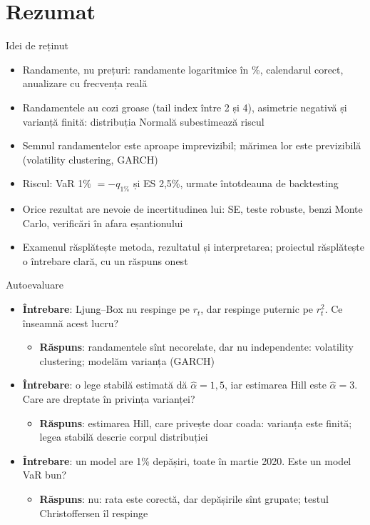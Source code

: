 \section{Rezumat}

\begin{frame}{Idei de reținut}
\itemsize{\small}
\begin{itemize}
    \item Randamente, nu prețuri: randamente logaritmice în \%, calendarul corect, anualizare cu frecvența reală
    \item Randamentele au cozi groase (tail index între 2 și 4), asimetrie negativă și varianță finită: distribuția Normală subestimează riscul
    \item Semnul randamentelor este aproape imprevizibil; mărimea lor este previzibilă (volatility clustering, GARCH)
    \item Riscul: VaR 1\% $= -q_{1\%}$ și ES 2,5\%, urmate întotdeauna de backtesting
    \item Orice rezultat are nevoie de incertitudinea lui: SE, teste robuste, benzi Monte Carlo, verificări în afara eșantionului
    \item Examenul răsplătește metoda, rezultatul și interpretarea; proiectul răsplătește o întrebare clară, cu un răspuns onest
\end{itemize}
\end{frame}

\begin{frame}{Autoevaluare}
\itemsize{\small}
\begin{itemize}
    \item \textbf{Întrebare}: Ljung--Box nu respinge pe $r_t$, dar respinge puternic pe $r_t^2$. Ce înseamnă acest lucru?
    \begin{itemize}
        \item \textbf{Răspuns}: randamentele sînt necorelate, dar nu independente: volatility clustering; modelăm varianța (GARCH)
    \end{itemize}
    \item \textbf{Întrebare}: o lege stabilă estimată dă $\hat\alpha = 1{,}5$, iar estimarea Hill este $\hat\alpha = 3$. Care are dreptate în privința varianței?
    \begin{itemize}
        \item \textbf{Răspuns}: estimarea Hill, care privește doar coada: varianța este finită; legea stabilă descrie corpul distribuției
    \end{itemize}
    \item \textbf{Întrebare}: un model are 1\% depășiri, toate în martie 2020. Este un model VaR bun?
    \begin{itemize}
        \item \textbf{Răspuns}: nu: rata este corectă, dar depășirile sînt grupate; testul Christoffersen îl respinge
    \end{itemize}
\end{itemize}
\end{frame}


